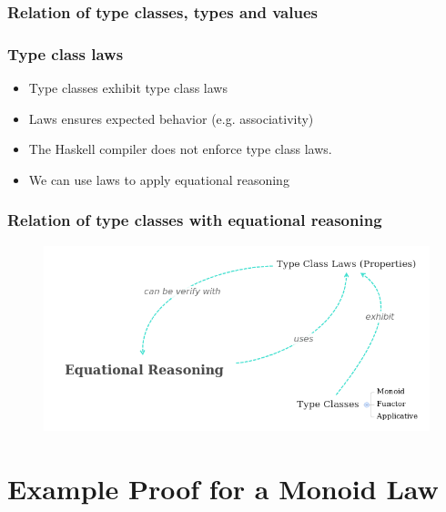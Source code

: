 \documentclass{beamer}
\begin{document}
\begin{frame}
\frametitle{Relation of type classes, types and values}


\end{frame}

\begin{frame}
\frametitle{Type class laws}
  \begin{itemize}
\item Type classes exhibit type class laws
\item Laws ensures expected behavior (e.g. associativity)
\item The Haskell compiler does not enforce type class laws.
\item We can use laws to apply equational reasoning
\end{itemize}  
\end{frame}

\begin{frame}
\frametitle{Relation of type classes with equational reasoning}
  \begin{figure}
  \centering
     \includegraphics[scale=0.4]{mindmap}
\end{figure}
\end{frame}

\lstset{
basicstyle=\ttfamily,
columns=fullflexible,
keepspaces=true,
captionpos=b
}

\section{Example Proof for a Monoid Law }
\end{document}

